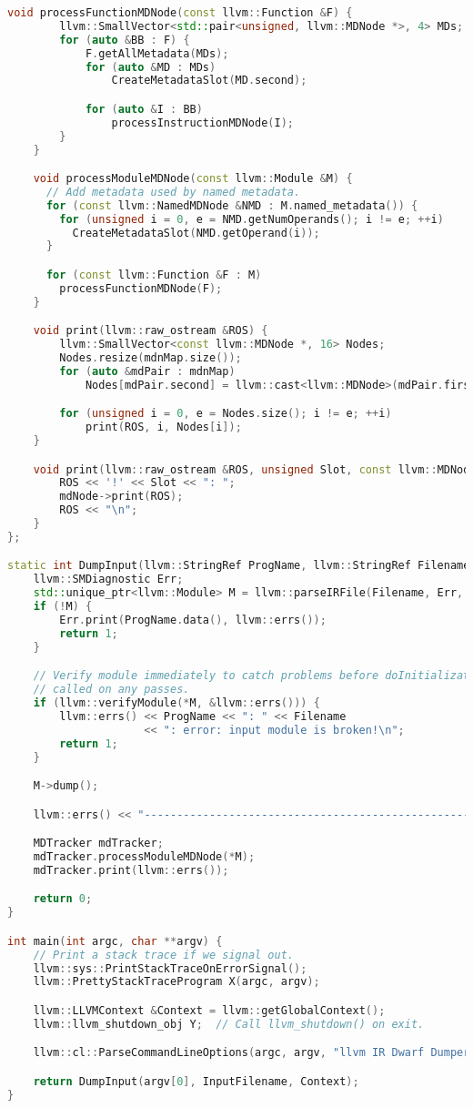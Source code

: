 \documentclass{ctexart}
\begin{document}
\begin{lstlisting}[language=C++]
    void processFunctionMDNode(const llvm::Function &F) {
        llvm::SmallVector<std::pair<unsigned, llvm::MDNode *>, 4> MDs;
        for (auto &BB : F) {
            F.getAllMetadata(MDs);
            for (auto &MD : MDs)
                CreateMetadataSlot(MD.second);

            for (auto &I : BB)
                processInstructionMDNode(I);
        }
    }

    void processModuleMDNode(const llvm::Module &M) {
      // Add metadata used by named metadata.
      for (const llvm::NamedMDNode &NMD : M.named_metadata()) {
        for (unsigned i = 0, e = NMD.getNumOperands(); i != e; ++i)
          CreateMetadataSlot(NMD.getOperand(i));
      }

      for (const llvm::Function &F : M)
        processFunctionMDNode(F);
    }

    void print(llvm::raw_ostream &ROS) {
        llvm::SmallVector<const llvm::MDNode *, 16> Nodes;
        Nodes.resize(mdnMap.size());
        for (auto &mdPair : mdnMap)
            Nodes[mdPair.second] = llvm::cast<llvm::MDNode>(mdPair.first);

        for (unsigned i = 0, e = Nodes.size(); i != e; ++i)
            print(ROS, i, Nodes[i]);
    }

    void print(llvm::raw_ostream &ROS, unsigned Slot, const llvm::MDNode *mdNode) {
        ROS << '!' << Slot << ": ";
        mdNode->print(ROS);
        ROS << "\n";
    }
};

static int DumpInput(llvm::StringRef ProgName, llvm::StringRef Filename, llvm::LLVMContext &Context) {
    llvm::SMDiagnostic Err;
    std::unique_ptr<llvm::Module> M = llvm::parseIRFile(Filename, Err, Context);
    if (!M) {
        Err.print(ProgName.data(), llvm::errs());
        return 1;
    }

    // Verify module immediately to catch problems before doInitialization() is
    // called on any passes.
    if (llvm::verifyModule(*M, &llvm::errs())) {
        llvm::errs() << ProgName << ": " << Filename
                     << ": error: input module is broken!\n";
        return 1;
    }

    M->dump();

    llvm::errs() << "-----------------------------------------------------\n";

    MDTracker mdTracker;
    mdTracker.processModuleMDNode(*M);
    mdTracker.print(llvm::errs());

    return 0;
}

int main(int argc, char **argv) {
    // Print a stack trace if we signal out.
    llvm::sys::PrintStackTraceOnErrorSignal();
    llvm::PrettyStackTraceProgram X(argc, argv);

    llvm::LLVMContext &Context = llvm::getGlobalContext();
    llvm::llvm_shutdown_obj Y;  // Call llvm_shutdown() on exit.

    llvm::cl::ParseCommandLineOptions(argc, argv, "llvm IR Dwarf Dumper\n");

    return DumpInput(argv[0], InputFilename, Context);
}
\end{lstlisting}
\end{document}
